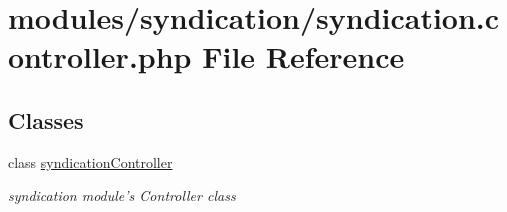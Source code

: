 \hypertarget{syndication_8controller_8php}{\section{modules/syndication/syndication.controller.\-php File Reference}
\label{syndication_8controller_8php}
}
\subsection*{Classes}
\begin{DoxyCompactItemize}
\item 
class \hyperlink{classsyndicationController}{syndication\-Controller}
\begin{DoxyCompactList}\small\item\em syndication module's Controller class \end{DoxyCompactList}\end{DoxyCompactItemize}
